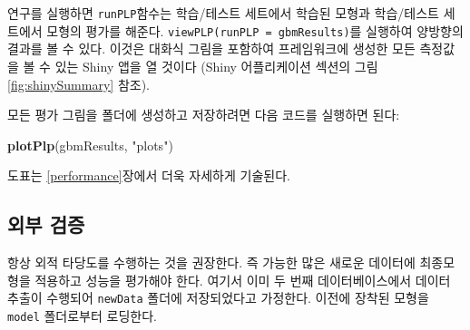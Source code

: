 \documentclass[11pt]{book}
\newenvironment{Shaded}{\begin{snugshade}}{\end{snugshade}}
\newcommand{\KeywordTok}[1]{\textcolor[rgb]{0.13,0.29,0.53}{\textbf{#1}}}
\newcommand{\StringTok}[1]{\textcolor[rgb]{0.31,0.60,0.02}{#1}}
\newcommand{\NormalTok}[1]{#1}
\theoremstyle{definition}
\theoremstyle{definition}
\theoremstyle{definition}
\theoremstyle{remark}
\begin{document}
연구를 실행하면 \texttt{runPLP}함수는 학습/테스트 세트에서 학습된 모형과
학습/테스트 세트에서 모형의 평가를 해준다.
\texttt{viewPLP(runPLP\ =\ gbmResults)}를 실행하여 양방향의 결과를 볼 수
있다. 이것은 대화식 그림을 포함하여 프레임워크에 생성한 모든 측정값을 볼
수 있는 Shiny 앱을 열 것이다 (Shiny 어플리케이션 섹션의 그림
\ref{fig:shinySummary} 참조).

모든 평가 그림을 폴더에 생성하고 저장하려면 다음 코드를 실행하면 된다:

\begin{Shaded}
\begin{Highlighting}[]
\KeywordTok{plotPlp}\NormalTok{(gbmResults, }\StringTok{"plots"}\NormalTok{)}
\end{Highlighting}
\end{Shaded}

도표는 \ref{performance}장에서 더욱 자세하게 기술된다.

\subsection{외부 검증}\label{-}

항상 외적 타당도를 수행하는 것을 권장한다. 즉 가능한 많은 새로운
데이터에 최종모형을 적용하고 성능을 평가해야 한다. 여기서 이미 두 번째
데이터베이스에서 데이터 추출이 수행되어 \texttt{newData} 폴더에
저장되었다고 가정한다. 이전에 장착된 모형을 \texttt{model} 폴더로부터
로딩한다.
\end{document}
